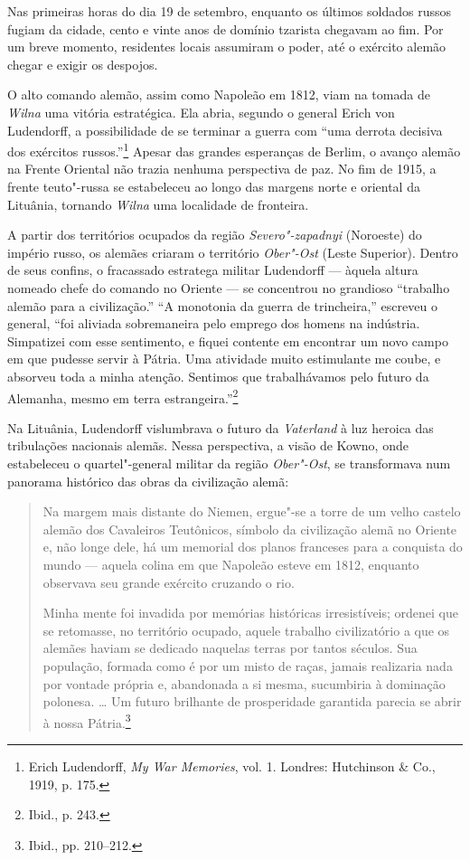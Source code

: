 Nas primeiras horas do dia 19 de setembro, enquanto os últimos soldados
russos fugiam da cidade, cento e vinte anos de domínio tzarista chegavam
ao fim. Por um breve momento, residentes locais assumiram o poder, até o
exército alemão chegar e exigir os despojos.

O alto comando alemão, assim como Napoleão em 1812, viam na tomada de
\textit{Wilna} uma vitória estratégica. Ela abria, segundo o general Erich von
Ludendorff, a possibilidade de se terminar a guerra com ``uma derrota
decisiva dos exércitos russos.''\footnote{Erich Ludendorff, \textit{My War Memories}, vol. 1. Londres: Hutchinson \& Co., 1919, p. 175.} Apesar das grandes esperanças de Berlim, o avanço alemão na Frente Oriental não
trazia nenhuma perspectiva de paz. No fim de 1915, a frente teuto"-russa
se estabeleceu ao longo das margens norte e oriental da Lituânia,
tornando \textit{Wilna} uma localidade de fronteira.

A partir dos territórios ocupados da região \textit{Severo"-zapadnyi}
(Noroeste) do império russo, os alemães criaram o território
\textit{Ober"-Ost} (Leste Superior). Dentro de seus confins, o fracassado
estratega militar Ludendorff --- àquela altura nomeado chefe do comando no
Oriente --- se concentrou no grandioso ``trabalho alemão para a
civilização.'' ``A monotonia da guerra de trincheira,'' escreveu o
general, ``foi aliviada sobremaneira pelo emprego dos homens na
indústria. Simpatizei com esse sentimento, e fiquei contente em
encontrar um novo campo em que pudesse servir à Pátria. Uma atividade
muito estimulante me coube, e absorveu toda a minha atenção. Sentimos
que trabalhávamos pelo futuro da Alemanha, mesmo em terra
estrangeira.''\footnote{Ibid., p. 243.}

Na Lituânia, Ludendorff vislumbrava o futuro da \textit{Vaterland} à luz
heroica das tribulações nacionais alemãs. Nessa perspectiva, a visão de
Kowno, onde estabeleceu o quartel"-general militar da região
\textit{Ober"-Ost}, se transformava num panorama histórico das obras da
civilização alemã:

\begin{quote}
Na margem mais distante do Niemen, ergue"-se a torre de um velho castelo
alemão dos Cavaleiros Teutônicos, símbolo da civilização alemã no
Oriente e, não longe dele, há um memorial dos planos franceses para a
conquista do mundo --- aquela colina em que Napoleão esteve em 1812,
enquanto observava seu grande exército cruzando o rio.

Minha mente foi invadida por memórias históricas irresistíveis; ordenei
que se retomasse, no território ocupado, aquele trabalho civilizatório a
que os alemães haviam se dedicado naquelas terras por tantos séculos.
Sua população, formada como é por um misto de raças, jamais realizaria
nada por vontade própria e, abandonada a si mesma, sucumbiria à
dominação polonesa. \ldots{} Um futuro brilhante de prosperidade
garantida parecia se abrir à nossa Pátria.\footnote{Ibid., pp. 210--212.}
\end{quote}

